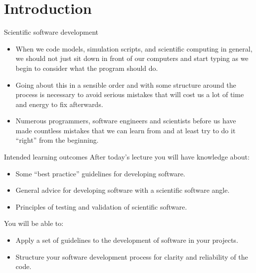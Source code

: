 \documentclass[english]{beamer}
\newcommand{\sectionslide}{\centering\vspace*{25mm}%
  {\bfseries\LARGE \insertsection}}
\begin{document}
\section{Introduction}

\begin{frame}
  \sectionslide
\end{frame}


\begin{frame}{\insertsection}{Scientific software development}

\begin{itemize}
\item When we code models, simulation scripts, and scientific
  computing in general, we should not just sit down in front of our
  computers and start typing as we begin to consider what the program
  should do.
\item Going about this in a sensible order and with some structure
  around the process is necessary to avoid serious mistakes that will
  cost us a lot of time and energy to fix afterwards.
\item Numerous programmers, software engineers and scientists before
  us have made countless mistakes that we can learn from and at least
  try to do it ``right'' from the beginning.
\end{itemize}

\end{frame}


\begin{frame}{\insertsection}{Intended learning outcomes}
  After today's lecture you will have knowledge about:
  \begin{itemize}
  \item Some ``best practice'' guidelines for developing software.
  \item General advice for developing software with a scientific
    software angle.
  \item Principles of testing and validation of scientific software.
  \end{itemize}
  You will be able to:
  \begin{itemize}
  \item Apply a set of guidelines to the development of software in
    your projects.
  \item Structure your software development process for clarity and
    reliability of the code.
  \end{itemize}
\end{frame}
\end{document}
